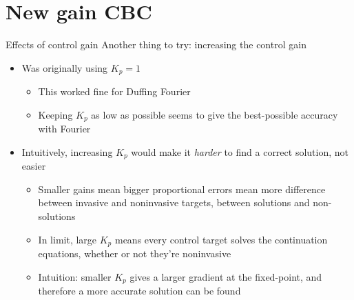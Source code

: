 \documentclass[presentation]{beamer}
\begin{document}
\section{New gain CBC}
\label{sec:org8930d19}
\begin{frame}[label={sec:org1e39b62}]{Effects of control gain}
Another thing to try: increasing the control gain
\vfill
\begin{itemize}
\item Was originally using \(K_p = 1\)
\begin{itemize}
\item This worked fine for Duffing Fourier
\item Keeping \(K_p\) as low as possible seems to give the best-possible accuracy with Fourier
\end{itemize}
\end{itemize}
\vfill
\begin{itemize}
\item Intuitively, increasing \(K_p\) would make it \emph{harder} to find a correct solution, not easier
\begin{itemize}
\item Smaller gains mean bigger proportional errors mean more difference between invasive and noninvasive targets, between solutions and non-solutions
\item In limit, large \(K_p\) means every control target solves the continuation equations, whether or not they're noninvasive
\item Intuition: smaller \(K_p\) gives a larger gradient at the fixed-point, and therefore a more accurate solution can be found
\end{itemize}
\end{itemize}
\end{frame}
\end{document}
